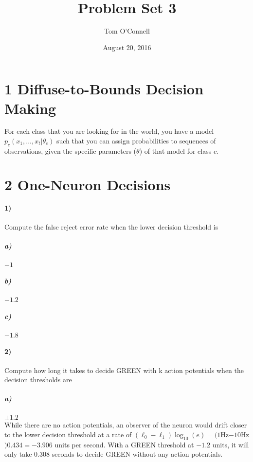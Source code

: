 \documentclass[10pt,letter]{article}
\begin{document}


\title{Problem Set 3}

\author{Tom O'Connell}

\date{August 20, 2016}
 
\maketitle 


\section*{1 Diffuse-to-Bounds Decision Making}

For each class that you are looking for in the world, you have a model $p_c(x_1,...,x_t | \theta_c)$ 
such that you can assign probabilities to sequences of observations, given the specific parameters 
($\theta$) of that model for class $c$.




\section*{2 One-Neuron Decisions}

\paragraph{1)} Compute the false reject error rate when the lower decision threshold is

\subparagraph{a)} $-1$

\subparagraph{b)} $-1.2$

\subparagraph{c)} $-1.8$

\paragraph{2)} Compute how long it takes to decide GREEN with k action potentials when the decision
thresholds are

\subparagraph{a)} $\pm 1.2$\\

While there are no action potentials, an observer of the neuron would drift closer to the lower 
decision threshold at a rate of $(\ell_0 - \ell_1)\log_{10}(e) = (1 $Hz$ - 10 $Hz$)  0.434 = -3.906$
units per second. With a GREEN threshold at $-1.2$ units, it will only take $0.308$ seconds to 
decide GREEN without any action potentials.\\
\end{document}
